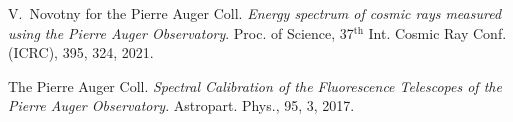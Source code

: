\documentclass[11pt,spanish]{article}
\begin{document}
\begin{thebibliography}{99}

V.~Novotny for the Pierre Auger Coll. \textit{Energy spectrum of cosmic rays measured using the Pierre Auger Observatory}. Proc. of Science, 37$^\text{th}$ Int. Cosmic Ray Conf. (ICRC), 395, 324, 2021.

The Pierre Auger Coll. \textit{Spectral Calibration of the Fluorescence Telescopes of the Pierre Auger Observatory}. Astropart. Phys., 95, 3, 2017.

\end{thebibliography}
\end{document}
